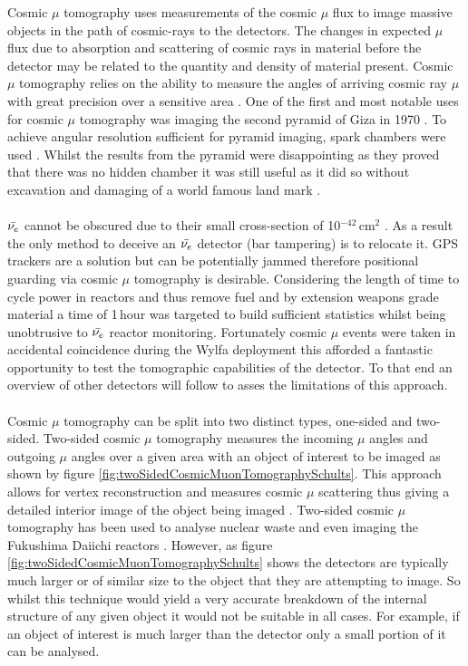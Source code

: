 Cosmic $\mu$ tomography uses measurements of the cosmic $\mu$ flux to image massive objects in the path of cosmic-rays to the detectors. The changes in expected $\mu$ flux due to absorption and scattering of cosmic rays in material before the detector may be related to the quantity and density of material present. Cosmic $\mu$ tomography relies on  the ability to measure the angles of arriving cosmic ray $\mu$ with great precision over a sensitive area \cite{Alvarez_Pyramids_1970}. One of the first and most notable uses for cosmic $\mu$ tomography was imaging the second pyramid of Giza in 1970 \cite{Alvarez_Pyramids_1970}. To achieve angular resolution sufficient for pyramid imaging, spark chambers were used \cite{Alvarez_Pyramids_1970}. Whilst the results from the pyramid were disappointing as they proved that there was no hidden chamber it was still useful as it did so without excavation and damaging of a world famous land mark \cite{Alvarez_Pyramids_1970}. 
\\\\$\Bar{\nu_e}$ cannot be obscured due to their small cross-section of 10$^{-42}$\,cm$^2$ \cite{Vogel_1999}. As a result the only method to deceive an $\Bar{\nu_e}$ detector (bar tampering) is to relocate it. GPS trackers are a solution but can be potentially jammed therefore positional guarding via cosmic $\mu$ tomography is desirable. Considering the length of time to cycle power in reactors and thus remove fuel and by extension weapons grade material a time of 1\,hour was targeted to build sufficient statistics whilst being unobtrusive to $\Bar{\nu_e}$ reactor monitoring. Fortunately cosmic $\mu$ events were taken in accidental coincidence during the Wylfa deployment this afforded a fantastic opportunity to test the tomographic capabilities of the detector. To that end an overview of other detectors will follow to asses the limitations of this approach. 
\\\\Cosmic $\mu$ tomography can be split into two distinct types, one-sided and two-sided. Two-sided cosmic $\mu$ tomography measures the incoming $\mu$ angles and outgoing $\mu$ angles over a given area with an object of interest to be imaged as shown by figure \ref{fig:twoSidedCosmicMuonTomographySchults}. This approach allows for vertex reconstruction and measures cosmic $\mu$ scattering thus giving a detailed interior image of the object being imaged \cite{schultz_2007}. Two-sided cosmic $\mu$ tomography has been used to analyse nuclear waste \cite{jonkmans2013nuclear} and even imaging the Fukushima Daiichi reactors \cite{miyadera2013imaging}. However, as figure \ref{fig:twoSidedCosmicMuonTomographySchults} shows the  detectors are typically much larger or of similar size to the object that they are attempting to image. So whilst this technique would yield a very accurate breakdown of the internal structure of any given object it would not be suitable in all cases. For example, if an object of interest is much larger than the detector only a small portion of it can be analysed. 


